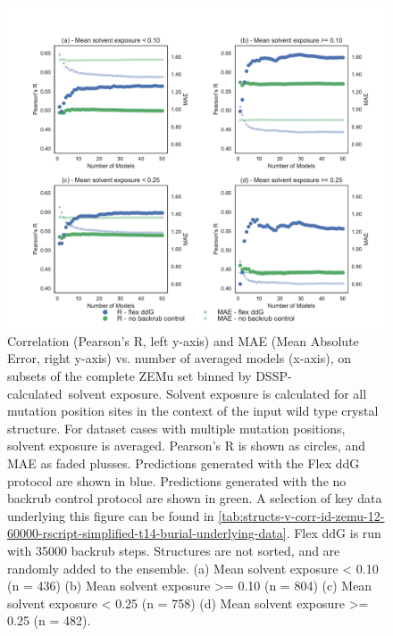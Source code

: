 \begin{figure}
  \includegraphics[width=\textwidth,keepaspectratio]{structs-v-corr-id-zemu-12-60000-rscript-simplified-t14-burial.pdf}
  \caption[]{
    Correlation (Pearson's R, left y-axis) and MAE (Mean Absolute Error, right y-axis) vs. number of averaged models (x-axis), on subsets of the complete ZEMu set binned by DSSP-calculated\cite{kabsch_dictionary_1983,joosten_series_2011}\ solvent exposure.
    Solvent exposure is calculated for all mutation position sites in the context of the input wild type crystal structure.
    For dataset cases with multiple mutation positions, solvent exposure is averaged.
    Pearson's R is shown as circles, and MAE as faded plusses.
Predictions generated with the Flex ddG protocol are shown in blue.
Predictions generated with the no backrub control protocol are shown in green.
    A selection of key data underlying this figure can be found in \cref{tab:structs-v-corr-id-zemu-12-60000-rscript-simplified-t14-burial-underlying-data}. Flex ddG is run with 35000 backrub steps.
    Structures are not sorted, and are randomly added to the ensemble.
    (a) Mean solvent exposure < 0.10 (n = 436)
    (b) Mean solvent exposure >= 0.10 (n = 804)
    (c) Mean solvent exposure < 0.25 (n = 758)
    (d) Mean solvent exposure >= 0.25 (n = 482).
  } \label{fig:structs-v-corr-id-zemu-12-60000-rscript-simplified-t14-burial}
\end{figure}
